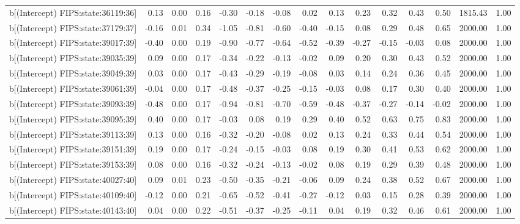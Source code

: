 \begin{table}[ht]
\begin{tabular}{rrrrrrrrrrrrrrr}
  b[(Intercept) FIPS:state:36119:36] & 0.13 & 0.00 & 0.16 & -0.30 & -0.18 & -0.08 & 0.02 & 0.13 & 0.23 & 0.32 & 0.43 & 0.50 & 1815.43 & 1.00 \\ 
  b[(Intercept) FIPS:state:37179:37] & -0.16 & 0.01 & 0.34 & -1.05 & -0.81 & -0.60 & -0.40 & -0.15 & 0.08 & 0.29 & 0.48 & 0.65 & 2000.00 & 1.00 \\ 
  b[(Intercept) FIPS:state:39017:39] & -0.40 & 0.00 & 0.19 & -0.90 & -0.77 & -0.64 & -0.52 & -0.39 & -0.27 & -0.15 & -0.03 & 0.08 & 2000.00 & 1.00 \\ 
  b[(Intercept) FIPS:state:39035:39] & 0.09 & 0.00 & 0.17 & -0.34 & -0.22 & -0.13 & -0.02 & 0.09 & 0.20 & 0.30 & 0.43 & 0.52 & 2000.00 & 1.00 \\ 
  b[(Intercept) FIPS:state:39049:39] & 0.03 & 0.00 & 0.17 & -0.43 & -0.29 & -0.19 & -0.08 & 0.03 & 0.14 & 0.24 & 0.36 & 0.45 & 2000.00 & 1.00 \\ 
  b[(Intercept) FIPS:state:39061:39] & -0.04 & 0.00 & 0.17 & -0.48 & -0.37 & -0.25 & -0.15 & -0.03 & 0.08 & 0.17 & 0.30 & 0.40 & 2000.00 & 1.00 \\ 
  b[(Intercept) FIPS:state:39093:39] & -0.48 & 0.00 & 0.17 & -0.94 & -0.81 & -0.70 & -0.59 & -0.48 & -0.37 & -0.27 & -0.14 & -0.02 & 2000.00 & 1.00 \\ 
  b[(Intercept) FIPS:state:39095:39] & 0.40 & 0.00 & 0.17 & -0.03 & 0.08 & 0.19 & 0.29 & 0.40 & 0.52 & 0.63 & 0.75 & 0.83 & 2000.00 & 1.00 \\ 
  b[(Intercept) FIPS:state:39113:39] & 0.13 & 0.00 & 0.16 & -0.32 & -0.20 & -0.08 & 0.02 & 0.13 & 0.24 & 0.33 & 0.44 & 0.54 & 2000.00 & 1.00 \\ 
  b[(Intercept) FIPS:state:39151:39] & 0.19 & 0.00 & 0.17 & -0.24 & -0.15 & -0.03 & 0.08 & 0.19 & 0.30 & 0.41 & 0.53 & 0.62 & 2000.00 & 1.00 \\ 
  b[(Intercept) FIPS:state:39153:39] & 0.08 & 0.00 & 0.16 & -0.32 & -0.24 & -0.13 & -0.02 & 0.08 & 0.19 & 0.29 & 0.39 & 0.48 & 2000.00 & 1.00 \\ 
  b[(Intercept) FIPS:state:40027:40] & 0.09 & 0.01 & 0.23 & -0.50 & -0.35 & -0.21 & -0.06 & 0.09 & 0.24 & 0.38 & 0.52 & 0.67 & 2000.00 & 1.00 \\ 
  b[(Intercept) FIPS:state:40109:40] & -0.12 & 0.00 & 0.21 & -0.65 & -0.52 & -0.41 & -0.27 & -0.12 & 0.03 & 0.15 & 0.28 & 0.39 & 2000.00 & 1.00 \\ 
  b[(Intercept) FIPS:state:40143:40] & 0.04 & 0.00 & 0.22 & -0.51 & -0.37 & -0.25 & -0.11 & 0.04 & 0.19 & 0.32 & 0.46 & 0.61 & 2000.00 & 1.00 \\ 

\end{tabular}
\end{table}
